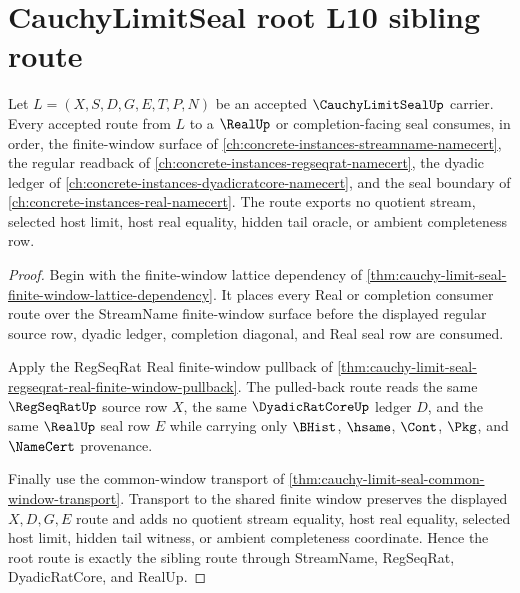 \section{CauchyLimitSeal root L10 sibling route}
\label{sec:cauchy-limit-seal-root-l10-sibling-route}

\begin{theorem}
\label{thm:cauchy-limit-seal-root-l10-sibling-route}
Let $L=(X,S,D,G,E,T,P,N)$ be an accepted $\CauchyLimitSealUp$ carrier. Every accepted route from $L$ to a $\RealUp$ or completion-facing seal consumes, in order, the finite-window surface of \autoref{ch:concrete-instances-streamname-namecert}, the regular readback of \autoref{ch:concrete-instances-regseqrat-namecert}, the dyadic ledger of \autoref{ch:concrete-instances-dyadicratcore-namecert}, and the seal boundary of \autoref{ch:concrete-instances-real-namecert}. The route exports no quotient stream, selected host limit, host real equality, hidden tail oracle, or ambient completeness row.
\end{theorem}
\begin{proof}
Begin with the finite-window lattice dependency of \autoref{thm:cauchy-limit-seal-finite-window-lattice-dependency}. It places every Real or completion consumer route over the StreamName finite-window surface before the displayed regular source row, dyadic ledger, completion diagonal, and Real seal row are consumed.

Apply the RegSeqRat Real finite-window pullback of \autoref{thm:cauchy-limit-seal-regseqrat-real-finite-window-pullback}. The pulled-back route reads the same $\RegSeqRatUp$ source row $X$, the same $\DyadicRatCoreUp$ ledger $D$, and the same $\RealUp$ seal row $E$ while carrying only $\BHist$, $\hsame$, $\Cont$, $\Pkg$, and $\NameCert$ provenance.

Finally use the common-window transport of \autoref{thm:cauchy-limit-seal-common-window-transport}. Transport to the shared finite window preserves the displayed $X,D,G,E$ route and adds no quotient stream equality, host real equality, selected host limit, hidden tail witness, or ambient completeness coordinate. Hence the root route is exactly the sibling route through StreamName, RegSeqRat, DyadicRatCore, and RealUp.
\end{proof}


